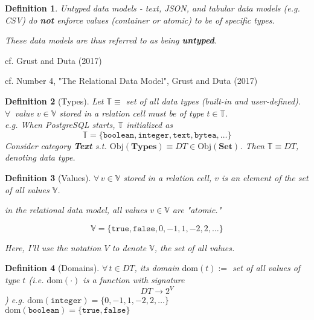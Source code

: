 \documentclass[10pt]{amsart}
\newtheorem{definition}{Definition}
\begin{document}
\begin{multicols*}{2}
\begin{definition}
	Untyped data models - text, JSON, and tabular data models (e.g. CSV) do \textbf{not} enforce values (container or atomic) to be of specific types. 
	
	These data models are thus referred to as being \textbf{untyped}.
\end{definition}
cf. Grust and Duta (2017) \cite{GrDu2017}


cf. Number 4, "The Relational Data Model", Grust and Duta (2017) \cite{GrDu2017}

\begin{definition}[Types]
Let $\mathbb{T} \equiv $ set of all data types (built-in and user-defined).  \\
$\forall \, $ value $v\in  \mathbb{V}$ stored in a relation cell must be of type $t\in \mathbb{T}$. \\
e.g. When PostgreSQL starts, $\mathbb{T}$ initialized as 
\begin{equation}
 \mathbb{T} = \lbrace \texttt{boolean}, \texttt{integer}, \texttt{text}, \texttt{bytea}, \dots \rbrace 
\end{equation}
Consider category \textbf{Text} s.t. $\text{Obj}(\mathbf{Types}) \equiv DT \in \text{Obj}(\textbf{Set})$. Then $\mathbb{T} \equiv DT$, denoting \emph{data type}.
\end{definition}

\begin{definition}[Values]
$\forall \, v \in \mathbb{V}$ stored in a relation cell, $v$ is an element of the set of all values $\mathbb{V}$. 

in the relational data model, all values $v\in \mathbb{V}$ are "atomic."

\[
\mathbb{V} = \lbrace \texttt{true}, \texttt{false}, 0, -1, 1, -2, 2 , \dots \rbrace
\]	

Here, I'll use the notation $V$ to denote $\mathbb{V}$, the set of all values.
\end{definition}

\begin{definition}[Domains]
	$\forall \, t \in DT$, its domain $\text{dom}(t) := $ set of all values of type $t$ (i.e. $\text{dom}(\cdot)$ is a function with signature 
	\[
	DT \to 2^V
	\])
	e.g. $\text{dom}(\texttt{integer}) = \lbrace 0 , -1, 1, -2, 2, \dots \rbrace $ \\
	$\text{dom}(\texttt{boolean}) = \lbrace \texttt{true}, \texttt{false} \rbrace$ 
\end{definition} 


\end{multicols*}
\end{document}
